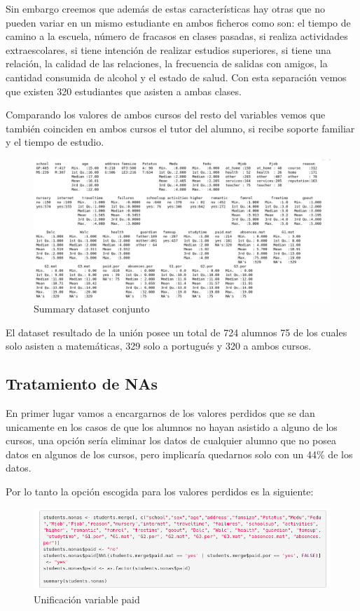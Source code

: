 \documentclass[12pt,a4paper]{article}
\begin{document}
Sin embargo creemos que además de estas características hay otras que no pueden variar en un mismo estudiante en ambos ficheros como son: el tiempo de camino a la escuela, número de fracasos en clases pasadas, si realiza actividades extraescolares, si tiene intención de realizar estudios superiores, si tiene una relación, la calidad de las relaciones, la frecuencia de salidas con amigos, la cantidad consumida de alcohol y el estado de salud. Con esta separación vemos que existen 320 estudiantes que asisten a ambas clases. 

Comparando los valores de ambos cursos del resto del variables vemos que también coinciden en ambos cursos el tutor del alumno, si recibe soporte familiar y el tiempo de estudio. 


 \begin{figure}[ht!]
	\centering
	\includegraphics[trim = 0mm 0mm 0mm 0mm, clip,scale=0.4]{images/summary_inicial}
	\caption{Summary dataset conjunto}
	\label{fig:sum1}
\end{figure}


El dataset resultado de la unión posee un total de 724 alumnos 75 de los cuales solo asisten a matemáticas, 329 solo a portugués y  320 a ambos cursos.


\subsection{Tratamiento de NAs}
En primer lugar vamos a encargarnos de los valores perdidos que se dan unicamente en los casos de que los alumnos no hayan asistido a alguno de los cursos, una opción sería eliminar los datos de cualquier alumno que no posea datos en algunos de los cursos, pero implicaría quedarnos solo con un 44\% de los datos. 


Por lo tanto la opción escogida para los valores perdidos es la siguiente: 


 \begin{figure}[ht!]
	\centering
	\includegraphics[trim = 0mm 0mm 0mm 0mm, clip,scale=0.5]{images/nonas_paid}
	\caption{Unificación variable paid}
	\label{fig:nonas_paid}
\end{figure}
\end{document}
